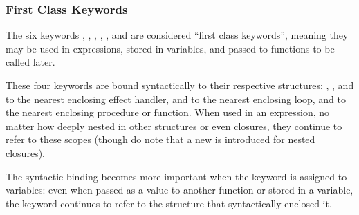 \subsubsection{First Class Keywords}
\label{sec:first-class-keyword}

The six keywords , , , , ,
and  are considered ``first class keywords'', meaning they may be
used in expressions, stored in variables, and passed to functions to be called later.

These four keywords are bound syntactically to their respective structures:
, , and  to the nearest enclosing effect handler,
 and  to the nearest enclosing loop, and  to the
nearest enclosing procedure or function. When used in an expression, no matter how
deeply nested in other structures or even closures, they continue to refer to these
scopes (though do note that a new  is introduced for nested closures).

The syntactic binding becomes more important when the keyword is assigned to variables:
even when passed as a value to another function or stored in a variable, the keyword
continues to refer to the structure that syntactically enclosed it.

\begin{bnf*}
     \\
     \\
     \\
     \\
     \\
     \\
     \\
     \\
\end{bnf*}

